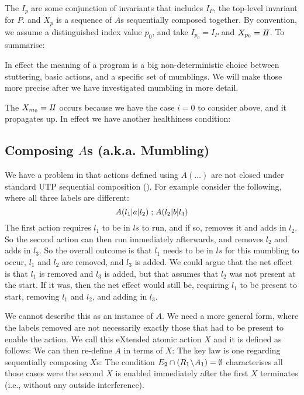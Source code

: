 The $I_p$ are some conjunction of invariants
that includes $I_P$, the top-level invariant for $P$.
and $X_p$ is a sequence of $A$s sequentially composed together.
By convention, we assume a distinguished index value $p_0$,
and take $I_{p_0} = I_P$ and $X_{p_0} = I\!I$.
To summarise:

In effect the meaning of a program is a big non-deterministic choice
between stuttering, basic actions,
and a specific set of mumblings.
We will make those more precise after we have investigated mumbling in more detail.

The $X_{m_0} =I\!I$ occurs because we have the case $i=0$ to consider above,
and it propagates up.
In effect we have another healthiness condition:


\subsection{Composing $A$s (a.k.a. Mumbling)}\label{ssec:comp-A}

We have a problem in that actions defined using $A(\dots)$
are not closed under standard UTP sequential composition ().
For example consider the following,
where all three labels are different:
\[
   A(l_1|a|l_2) \mathrel{;} A(l_2|b|l_3)
\]
The first action requires $l_1$ to be in $ls$ to run,
and if so, removes it and adds in $l_2$.
So the second action can then run immediately afterwards,
and removes $l_2$ and adds in $l_3$.
So the overall outcome is that $l_1$ needs to be in $ls$
for this mumbling to occur, $l_1$ and $l_2$ are removed,
and $l_3$ is added.
We could argue that the net effect is that $l_1$
is removed and $l_3$ is added,
but that assumes that $l_2$ was not present at the start.
If it was, then the net effect would still be,
requiring $l_1$ to be present to start,
removing $l_1$ and $l_2$, and adding in $l_3$.

We cannot describe this as an instance of $A$.
We need a more general form,
where the labels removed are not necessarily
exactly those that had to be present to enable the action.
We call this eXtended atomic action $X$ and it is defined as follows:
We can then re-define $A$ in terms of $X$:
The key law is one regarding sequentially composing $X$s:
The condition $E_2 \cap (R_1\!\setminus\! A_1) = \emptyset$
characterises all those cases were the second $X$ is enabled
immediately after the first $X$ terminates
(i.e., without any outside interference).

